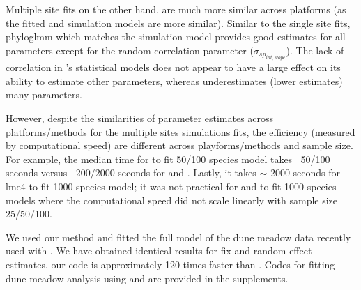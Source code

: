 \documentclass[12pt]{article}
\begin{document}
Multiple site fits on the other hand, are much more similar across platforms (as the fitted and simulation models are more similar).
Similar to the single site fits, phyloglmm which matches the simulation model provides good estimates for all parameters except for the random correlation parameter ($\sigma_{sp_{int,slope}}$).
The lack of correlation in 's statistical models does not appear to have a large effect on its ability to estimate other parameters, whereas  underestimates (lower estimates) many parameters.  

However, despite the similarities of parameter estimates across platforms/methods for the multiple sites simulations fits, the efficiency (measured by computational speed) are different across playforms/methods and sample size.
For example, the median time for  to fit 50/100 species model takes $~$ 50/100 seconds versus $~$ 200/2000 seconds for  and . 
Lastly, it takes $\sim$ 2000 seconds for lme4 to fit 1000 species model; it was not practical for  and  to fit 1000 species models where the computational speed did not scale linearly with sample size 25/50/100.


We used our method and fitted the full model of the dune meadow data recently used with  \cite{li2017canfun}. 
We have obtained identical results for fix and random effect estimates, our code is approximately 120 times faster than . 
Codes for fitting dune meadow analysis using  and  are provided in the supplements. 
\end{document}
